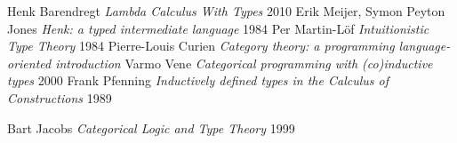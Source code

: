 \documentclass[11pt,oneside]{article}
\begin{document}
\begin{thebibliography}{9}

      Henk Barendregt \textit{Lambda Calculus With Types} 2010
       Erik Meijer, Symon Peyton Jones \textit{Henk: a typed intermediate language} 1984
        Per Martin-Löf \textit{Intuitionistic Type Theory} 1984
    Pierre-Louis Curien \textit{Category theory: a programming language-oriented introduction}
       Varmo Vene \textit{Categorical programming with (co)inductive types} 2000
   Frank Pfenning \textit{Inductively defined types in the Calculus of Constructions} 1989




     Bart Jacobs \textit{Categorical Logic and Type Theory} 1999

\end{thebibliography}
\newpage
\end{document}

